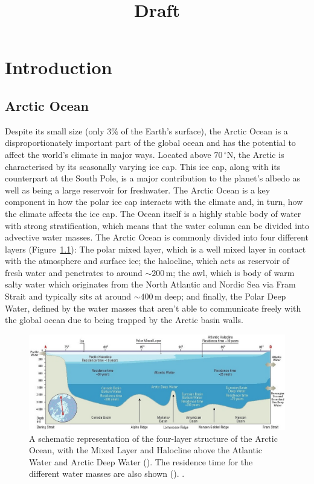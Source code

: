 \documentclass[10pt,a4paper]{report}
\title{Draft}
\newcommand*\figref[1]{Figure~\ref{#1}}
\begin{document}
\maketitle


\chapter{Introduction}

\glsresetall

\section{Arctic Ocean}
\label{arcticocean}


Despite its small size (only $3\%$ of the Earth's surface), the Arctic
Ocean is a disproportionately important part of the global ocean and has the potential
to affect the world's climate in major ways. Located above
$70\,^{\circ}\mathrm{N}$, the Arctic is characterised by its seasonally
varying ice cap. This ice cap, along with its counterpart at the South
Pole, is a major contribution to the planet's albedo as well as being
a large reservoir for freshwater. The Arctic Ocean is a key component
in how the polar ice cap interacts with the climate and, in turn, how
the climate affects the ice cap. 
The Ocean itself is a highly stable body of water with strong stratification, 
which means that the water column can be divided into advective water masses.
The Arctic Ocean is commonly divided into four different layers (\figref{fig:amap}):
The polar mixed layer, which is a well mixed layer in
contact with the atmosphere and surface ice; the halocline, which acts as
reservoir of fresh water and penetrates to around ${\sim}200\,\mathrm{m}$; the \gls{awl},
which is body of warm salty water which originates from the North Atlantic and Nordic 
Sea via Fram Strait and typically sits at around ${\sim}400\,\mathrm{m}$ deep; and finally, 
the Polar Deep Water, defined by the water masses that aren't
able to communicate freely with the global ocean due to being trapped by the Arctic basin walls.



\begin{figure}
	\centering
	\includegraphics[width=\linewidth]{amap}
	\caption[\cite{wilson1998amap}]{  A schematic representation of the four-layer structure of the Arctic Ocean, with the Mixed Layer and Halocline
		above the Atlantic Water and Arctic Deep Water (\cite{aagaard1989role}). 
		The residence time for the different water masses are also shown (\cite{bonisch1995deep}). \cite{wilson1998amap}.}
	\label{fig:amap}
\end{figure}
\end{document}
